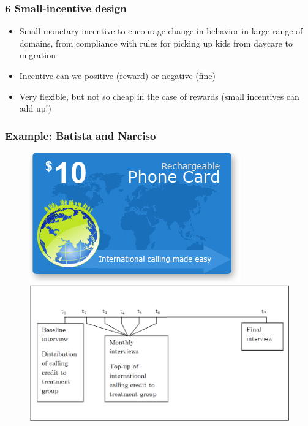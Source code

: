\documentclass[12pt,english,dvipsnames,aspectratio=169,handout]{beamer}\usepackage[]{graphicx}\usepackage[]{xcolor}
\begin{document}
\begin{frame}
	\frametitle{6 Small-incentive design}
	\footnotesize
\begin{itemize}
  \item Small monetary incentive to encourage change in behavior in large range of domains, from compliance with rules for picking up kids from daycare \cite{gneezy_fine_2000} to migration \cite{bryan_underinvestment_2014}
  \item Incentive can we positive (reward) or negative (fine) 
  \item Very flexible, but not so cheap in the case of rewards (small incentives can add up!) 
\end{itemize}
\vspace{3cm}
\end{frame}


\begin{frame}
	\frametitle{Example: Batista and Narciso \citeyear{batista_migrant_2013}}
    \begin{figure}[ht]
        \begin{minipage}[b]{0.3\linewidth}
            \centering
            \includegraphics[width=\textwidth]{../04-figures/12/19-w12_callcredit2}
        \end{minipage}
        \hspace{0.5cm}
        \begin{minipage}[b]{0.6\linewidth}
            \centering
            \includegraphics[width=\textwidth]{../04-figures/12/20-w12_callcredit}
        \end{minipage}
    \end{figure}
\end{frame}
\end{document}

